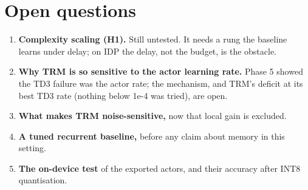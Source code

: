 \documentclass[11pt]{article}
\begin{document}
\section*{Open questions}



\begin{enumerate}
\item \textbf{Complexity scaling (H1).} Still untested. It needs a rung the baseline learns under delay; on IDP the delay, not the budget, is the obstacle.
\item \textbf{Why TRM is so sensitive to the actor learning rate.} Phase 5 showed the TD3 failure was the actor rate; the mechanism, and TRM's deficit at its best TD3 rate (nothing below 1e-4 was tried), are open.
\item \textbf{What makes TRM noise-sensitive,} now that local gain is excluded.
\item \textbf{A tuned recurrent baseline,} before any claim about memory in this setting.
\item \textbf{The on-device test} of the exported actors, and their accuracy after INT8 quantisation.
\end{enumerate}
\end{document}

